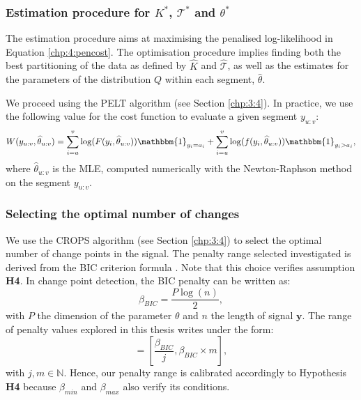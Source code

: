 \subsubsection{Estimation procedure for $K^*$, $\mathcal{T}^*$ and $\theta^*$}

The estimation procedure aims at maximising the penalised log-likelihood in Equation \eqref{chp:4:pencost}. The optimisation procedure implies finding both the best partitioning of the data as defined by $\widehat{K}$ and $\widehat{\mathcal{T}}$, as well as the estimates for the parameters of the distribution $Q$ within each segment, $\widehat{\theta}$. 

We proceed using the PELT algorithm (see Section \ref{chp:3:4}). In practice, we use the following value for the cost function to evaluate a given segment $y_{u:v}$:
\begin{equation}
W(y_{u:v},\widehat{\theta}_{u:v}) = \sum_{i=u}^v\log(F(y_i,\widehat{\theta}_{u:v}))\mathbbm{1}_{y_i=a_i}+\sum_{i=u}^v\log(f(y_i,\widehat{\theta}_{u:v}))\mathbbm{1}_{y_i>a_i},
\end{equation} 
where $\widehat{\theta}_{u:v}$ is the MLE, computed numerically with the Newton-Raphson method on the segment $y_{u:v}$.

\subsubsection{Selecting the optimal number of changes}

We use the CROPS algorithm (see Section \ref{chp:3:4}) to select the optimal number of change points in the signal. The penalty range selected investigated is derived from the BIC criterion formula \citep{YAO1988181}.  
Note that this choice verifies assumption \textbf{H4}. In change point detection, the BIC penalty can be written as: 
\begin{equation}
\beta_{BIC} = \frac{P\log(n)}{2},
\end{equation}
with $P$ the dimension of the parameter $\theta$ and $n$ the length of signal $\bm y$. The range of penalty values explored in this thesis writes under the form: 
\begin{equation}
[\beta_{min},\beta_{max}] = \left[\frac{\beta_{BIC}}{j},\beta_{BIC}\times m\right],
\end{equation}
with $j,m\in\mathbb{N}$. Hence, our penalty range is calibrated accordingly to Hypothesis \textbf{H4} because $\beta_{min}$ and $\beta_{max}$ also verify its conditions.  

